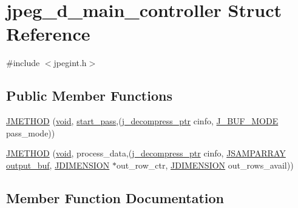 \hypertarget{structjpeg__d__main__controller}{}\section{jpeg\+\_\+d\+\_\+main\+\_\+controller Struct Reference}
\label{structjpeg__d__main__controller}


{\ttfamily \#include $<$jpegint.\+h$>$}

\subsection*{Public Member Functions}
\begin{DoxyCompactItemize}
\item 
\hyperlink{structjpeg__d__main__controller_a6fd68ad0d0296dcc299119db1128c294}{J\+M\+E\+T\+H\+O\+D} (\hyperlink{png_8h_aa8c59027f9ab2769342f248709d68d17}{void}, \hyperlink{jddctmgr_8c_a1964f006adb8fb80f57e455f6452aec1}{start\+\_\+pass},(\hyperlink{jpeglib_8h_a00c7d78af44bd26a901c791ccfc1e178}{j\+\_\+decompress\+\_\+ptr} cinfo, \hyperlink{jpegint_8h_a1f0803342372ac62b6903c399399c874}{J\+\_\+\+B\+U\+F\+\_\+\+M\+O\+D\+E} pass\+\_\+mode))
\item 
\hyperlink{structjpeg__d__main__controller_affd488d3ef78b5080ec5b2a00c8198a5}{J\+M\+E\+T\+H\+O\+D} (\hyperlink{png_8h_aa8c59027f9ab2769342f248709d68d17}{void}, process\+\_\+data,(\hyperlink{jpeglib_8h_a00c7d78af44bd26a901c791ccfc1e178}{j\+\_\+decompress\+\_\+ptr} cinfo, \hyperlink{jpeglib_8h_ac9d5d1b829ed51769db69a37271a7e91}{J\+S\+A\+M\+P\+A\+R\+R\+A\+Y} \hyperlink{jdct_8h_ad7e4660a191b1a791748dd44d5a7a0ec}{output\+\_\+buf}, \hyperlink{jmorecfg_8h_a04ed4674f6f1d0d50ec241531e38274f}{J\+D\+I\+M\+E\+N\+S\+I\+O\+N} $\ast$out\+\_\+row\+\_\+ctr, \hyperlink{jmorecfg_8h_a04ed4674f6f1d0d50ec241531e38274f}{J\+D\+I\+M\+E\+N\+S\+I\+O\+N} out\+\_\+rows\+\_\+avail))
\end{DoxyCompactItemize}


\subsection{Member Function Documentation}
\hypertarget{structjpeg__d__main__controller_a6fd68ad0d0296dcc299119db1128c294}{}

